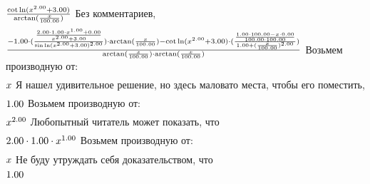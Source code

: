 \begin{math}
\frac {\cot \ln (x ^ {2.00 }+ 3.00 )}{\arctan (\frac {x }{100.00 })}\\
\end{math}
Без комментариев, 
\begin{gather}
\end{gather}
\begin{math}
\frac {-1.00 \cdot (\frac {\frac {2.00 \cdot 1.00 \cdot x ^ {1.00 }+ 0.00 }{x ^ {2.00 }+ 3.00 }}{\sin \ln (x ^ {2.00 }+ 3.00 )^ {2.00 }})\cdot \arctan (\frac {x }{100.00 })- \cot \ln (x ^ {2.00 }+ 3.00 )\cdot (\frac {\frac {1.00 \cdot 100.00 - x \cdot 0.00 }{100.00 \cdot 100.00 }}{1.00 + (\frac {x }{100.00 })^ {2.00 }})}{\arctan (\frac {x }{100.00 })\cdot \arctan (\frac {x }{100.00 })}\\
\end{math}
Возьмем производную от:
\begin{gather}
\end{gather}
\begin{math}
x \\
\end{math}
Я нашел удивительное решение, но здесь маловато места, чтобы его поместить, 
\begin{gather}
\end{gather}
\begin{math}
1.00 \\
\end{math}
Возьмем производную от:
\begin{gather}
\end{gather}
\begin{math}
x ^ {2.00 }\\
\end{math}
Любопытный читатель может показать, что
\begin{gather}
\end{gather}
\begin{math}
2.00 \cdot 1.00 \cdot x ^ {1.00 }\\
\end{math}
Возьмем производную от:
\begin{gather}
\end{gather}
\begin{math}
x \\
\end{math}
Не буду утруждать себя доказательством, что
\begin{gather}
\end{gather}
\begin{math}
1.00 \\
\end{math}
